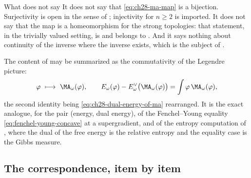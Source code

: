 \begin{warning}{What  does not say}
It does not say that \eqref{eq:ch28-ma-map} is a bijection.  Surjectivity is
open in the sense of ; injectivity for
\(n\geq2\) is imported.  It does not say that the map is a homeomorphism for
the strong topologies: that statement, in the trivially valued setting, is
\cite[Theorem~12.8]{BJ22} and belongs to
.  And it says nothing about continuity of
the inverse where the inverse exists, which is the subject of
.
\end{warning}

\begin{remark}
\label{rem:ch28-correspondence-line}
The content of  may be summarized as the
commutativity of the Legendre picture:
\[
 \varphi\ \longmapsto\ \MA_\omega(\varphi),
 \qquad
 E_\omega(\varphi)-E^\vee_\omega\bigl(\MA_\omega(\varphi)\bigr)
 =\int\varphi\,\MA_\omega(\varphi),
\]
the second identity being \eqref{eq:ch28-dual-energy-of-ma} rearranged.  It
is the exact analogue, for the pair (energy, dual energy), of the
Fenchel--Young equality \eqref{eq:fenchel-young-concave} at a supergradient,
and of the entropy computation of , where the
dual of the free energy is the relative entropy and the equality case is the
Gibbs measure.
\end{remark}

\subsection{The correspondence, item by item}
\label{sec:ch28-cy-table}

